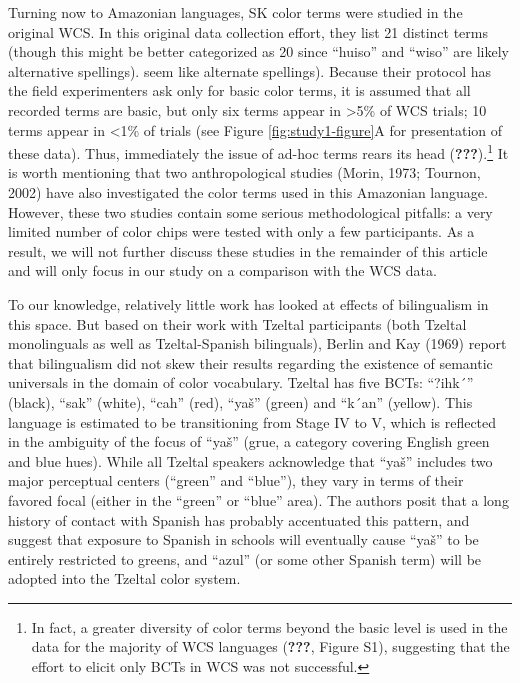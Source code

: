 \documentclass[
  english,
  ,man,floatsintext]{apa6}
\begin{document}
Turning now to Amazonian languages, SK color terms were studied in the original WCS. In this original data collection effort, they list 21 distinct terms (though this might be better categorized as 20 since \enquote{huiso} and \enquote{wiso} are likely alternative spellings). seem like alternate spellings). Because their protocol has the field experimenters ask only for basic color terms, it is assumed that all recorded terms are basic, but only six terms appear in \textgreater5\% of WCS trials; 10 terms appear in \textless1\% of trials (see Figure \ref{fig:study1-figure}A for presentation of these data). Thus, immediately the issue of ad-hoc terms rears its head ({\textbf{???}}).\footnote{In fact, a greater diversity of color terms beyond the basic level is used in the data for the majority of WCS languages ({\textbf{???}}, Figure S1), suggesting that the effort to elicit only BCTs in WCS was not successful.} It is worth mentioning that two anthropological studies (Morin, 1973; Tournon, 2002) have also investigated the color terms used in this Amazonian language. However, these two studies contain some serious methodological pitfalls: a very limited number of color chips were tested with only a few participants. As a result, we will not further discuss these studies in the remainder of this article and will only focus in our study on a comparison with the WCS data.

To our knowledge, relatively little work has looked at effects of bilingualism in this space. But based on their work with Tzeltal participants (both Tzeltal monolinguals as well as Tzeltal-Spanish bilinguals), Berlin and Kay (1969) report that bilingualism did not skew their results regarding the existence of semantic universals in the domain of color vocabulary. Tzeltal has five BCTs: \enquote{?ihk´} (black), \enquote{sak} (white), \enquote{cah} (red), \enquote{yaš} (green) and \enquote{k´an} (yellow). This language is estimated to be transitioning from Stage IV to V, which is reflected in the ambiguity of the focus of \enquote{yaš} (grue, a category covering English green and blue hues). While all Tzeltal speakers acknowledge that \enquote{yaš} includes two major perceptual centers (\enquote{green} and \enquote{blue}), they vary in terms of their favored focal (either in the \enquote{green} or \enquote{blue} area). The authors posit that a long history of contact with Spanish has probably accentuated this pattern, and suggest that exposure to Spanish in schools will eventually cause \enquote{yaš} to be entirely restricted to greens, and \enquote{azul} (or some other Spanish term) will be adopted into the Tzeltal color system.
\end{document}
